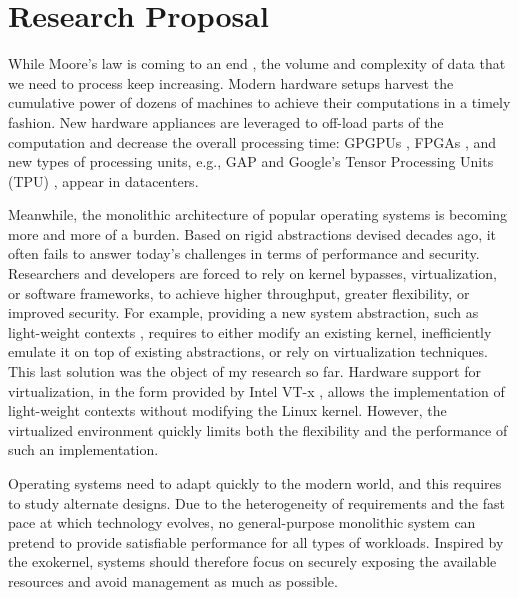 \section{Research Proposal}

While Moore's law is coming to an end \cite{DBLP:journals/cse/TheisW17,DBLP:journals/computer/DeBenedictis17}, the volume and complexity of data that we need to process keep increasing.
Modern hardware setups harvest the cumulative power of dozens of machines to achieve their computations in a timely fashion.
New hardware appliances are leveraged to off-load parts of the computation and decrease the overall processing time: GPGPUs \cite{DBLP:journals/pvldb/YuanL013,DBLP:conf/damon/KaldeweyLMV12,DBLP:journals/pvldb/Ailamaki15}, FPGAs \cite{DBLP:journals/cacm/PutnamCCCCDEFGG16}, and new types of processing units, e.g., GAP \cite{DARPAGAP} and Google's Tensor Processing Units (TPU) \cite{GoogleTPU}, appear in datacenters.

Meanwhile, the monolithic architecture of popular operating systems is becoming more and more of a burden.
Based on rigid abstractions devised decades ago, it often fails to answer today's challenges in terms of performance and security.
Researchers and developers are forced to rely on kernel bypasses, virtualization, or software frameworks, to achieve higher throughput, greater flexibility, or improved security.
For example, providing a new system abstraction, such as light-weight contexts \cite{DBLP:conf/osdi/LittonVE0BD16}, requires to either modify an existing kernel, inefficiently emulate it on top of existing abstractions, or rely on virtualization techniques.
This last solution was the object of my research so far.
Hardware support for virtualization, in the form provided by Intel VT-x \cite{DBLP:journals/computer/UhligNRSMABKLS05}, allows the implementation of light-weight contexts without modifying the Linux kernel.
However, the virtualized environment quickly limits both the flexibility and the performance of such an implementation.

Operating systems need to adapt quickly to the modern world, and this requires to study alternate designs.
Due to the heterogeneity of requirements and the fast pace at which technology evolves, no general-purpose monolithic system can pretend to provide satisfiable performance for all types of workloads.
Inspired by the exokernel, systems should therefore focus on securely exposing the available resources and avoid management as much as possible.

